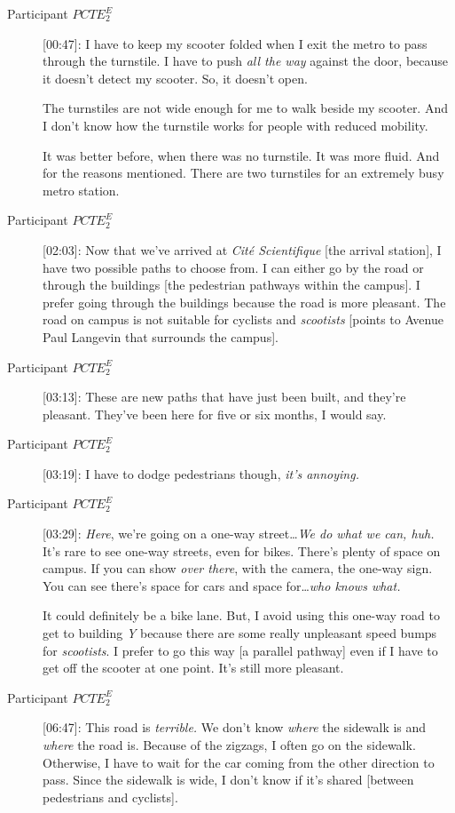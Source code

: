 \begin{description}
    \item[Participant \(PCTE^{E}_{2}\)] [00:47]: I have to keep my scooter folded when I exit the metro to pass through the turnstile. I have to push \textsl{all the way} against the door, because it doesn’t detect my scooter. So, it doesn’t open.%

    The turnstiles are not wide enough for me to walk beside my scooter. And I don’t know how the turnstile works for people with reduced mobility.%

    It was better before, when there was no turnstile. It was more fluid. And for the reasons mentioned. There are two turnstiles for an extremely busy metro station.
    \item[Participant \(PCTE^{E}_{2}\)] [02:03]: Now that we’ve arrived at \textsl{Cité Scientifique} [the arrival station], I have two possible paths to choose from. I can either go by the road or through the buildings [the pedestrian pathways within the campus]. I prefer going through the buildings because the road is more pleasant. The road on campus is not suitable for cyclists and \textsl{scootists} [points to Avenue Paul Langevin that surrounds the campus].
    \item[Participant \(PCTE^{E}_{2}\)] [03:13]: These are new paths that have just been built, and they’re pleasant. They’ve been here for five or six months, I would say.
    \item[Participant \(PCTE^{E}_{2}\)] [03:19]: I have to dodge pedestrians though, \textsl{it’s annoying.}
    \item[Participant \(PCTE^{E}_{2}\)] [03:29]: \textsl{Here}, we’re going on a one-way street\dots \textsl{We do what we can, huh.} It’s rare to see one-way streets, even for bikes. There’s plenty of space on campus. If you can show \textsl{over there}, with the camera, the one-way sign. You can see there’s space for cars and space for\dots \textsl{who knows what.}%

    It could definitely be a bike lane. But, I avoid using this one-way road to get to building \textsl{Y} because there are some really unpleasant speed bumps for \textsl{scootists}. I prefer to go this way [a parallel pathway] even if I have to get off the scooter at one point. It’s still more pleasant.
    \item[Participant \(PCTE^{E}_{2}\)] [06:47]: This road is \textsl{terrible.} We don’t know \textsl{where} the sidewalk is and \textsl{where} the road is. Because of the zigzags, I often go on the sidewalk. Otherwise, I have to wait for the car coming from the other direction to pass. Since the sidewalk is wide, I don’t know if it’s shared [between pedestrians and cyclists].%
\end{description}

